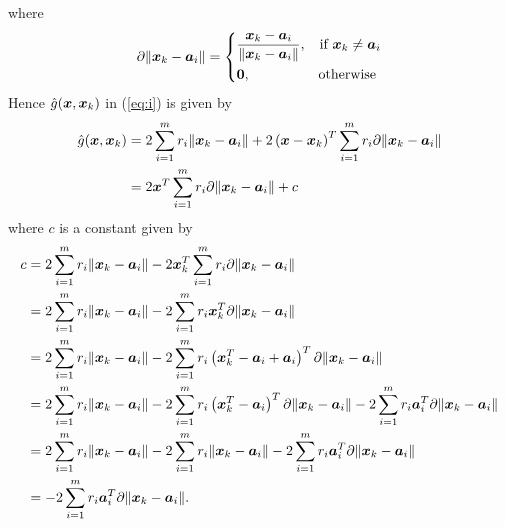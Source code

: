where
\begin{equation}
\nonumber
\partial \|\Bx_k - \Ba_i\|  = \left\{
	\begin{aligned}
	& \frac{\Bx_k - \Ba_i}{\|\Bx_k - \Ba_i\|}, &\mbox{if } \Bx_k \neq \Ba_i \\
	& \BO, &\mbox{otherwise }%
	\end{aligned}
\right.
\end{equation}
Hence  $\hat{g}(\mbox{\boldmath$x$}, \mbox{\boldmath$x$}_k)$ in (\ref{eq:i}) is given by
\begin{equation} %
\nonumber
\begin{aligned}
 \hat{g}(\Bx, \Bx_k)& =   2 \sum^m_{i=1} r_i \|\Bx_k - \Ba_i\|   +  2 \left( \Bx - \Bx_k \right)^{T} \sum^m_{i=1} r_i \partial \|\Bx_k - \Ba_i\| \\
& = 2\Bx^T \sum^m_{i=1} r_i \partial \|\Bx_k - \Ba_i \| + c
 \end{aligned}
\end{equation}
where $c$ is a constant given by 
\begin{equation}
\nonumber
\begin{aligned}
 c & =  2\sum^m_{i=1} r_i \|\mbox{\boldmath$x$}_k - \mbox{\boldmath$a$}_i\|   -  2 \mbox{\boldmath$x$}_k^T \sum^m_{i=1} r_i \partial \|\mbox{\boldmath$x$}_k - \mbox{\boldmath$a$}_i\| \\
& =  2\sum^m_{i=1} r_i \|\mbox{\boldmath$x$}_k - \mbox{\boldmath$a$}_i\|   -  2 \sum^m_{i=1} r_i \mbox{\boldmath$x$}_k^T \partial \|\mbox{\boldmath$x$}_k - \mbox{\boldmath$a$}_i\| \\
& = 2\sum^m_{i=1} r_i \|\mbox{\boldmath$x$}_k - \mbox{\boldmath$a$}_i\|   -  2 \sum^m_{i=1} r_i \left(\mbox{\boldmath$x$}_k^T - \mbox{\boldmath$a$}_i +\mbox{\boldmath$a$}_i\right)^T\partial \|\mbox{\boldmath$x$}_k - \mbox{\boldmath$a$}_i\| \\
& = 2\sum^m_{i=1} r_i \|\mbox{\boldmath$x$}_k - \mbox{\boldmath$a$}_i\|  -  2 \sum^m_{i=1} r_i \left(\mbox{\boldmath$x$}_k^T - \mbox{\boldmath$a$}_i\right)^T\partial \|\mbox{\boldmath$x$}_k - \mbox{\boldmath$a$}_i\| -2 \sum_{i = 1}^m r_i \mbox{\boldmath$a$}_i^T \partial \|\mbox{\boldmath$x$}_k - \mbox{\boldmath$a$}_i\| \\ 
& =  2\sum^m_{i=1} r_i \|\mbox{\boldmath$x$}_k - \mbox{\boldmath$a$}_i\| -  2\sum^m_{i=1} r_i \|\mbox{\boldmath$x$}_k - \mbox{\boldmath$a$}_i\| -2 \sum_{i = 1}^m r_i \mbox{\boldmath$a$}_i^T \partial \|\mbox{\boldmath$x$}_k - \mbox{\boldmath$a$}_i\| \\
& =  -2 \sum_{i = 1}^m r_i \mbox{\boldmath$a$}_i^T \partial \|\mbox{\boldmath$x$}_k - \mbox{\boldmath$a$}_i\|.
\end{aligned}
\end{equation}
%
